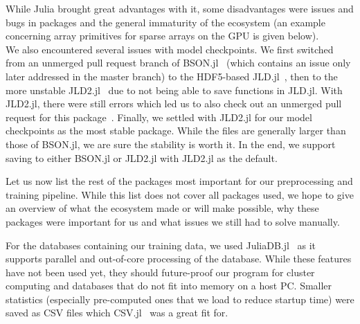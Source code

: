 While Julia brought great advantages with it, some disadvantages were
issues and bugs in packages and the general immaturity of the
ecosystem (an example concerning array primitives for sparse arrays on
the GPU is given below). \\
We also encountered several issues with model checkpoints. We first
switched from an unmerged pull request branch of
BSON.jl~\cite{JuliaIOBSONJl2019,SavingArrayLength} (which contains an
issue only later addressed in the master branch) to the HDF5-based
JLD.jl~\cite{JuliaIOJLDJl2019}, then to the more unstable
JLD2.jl~\cite{JuliaIOJLD2Jl2019} due to not being able to save
functions in JLD.jl. With JLD2.jl, there were still errors which led
us to also check out an unmerged pull request for this
package~\cite{MaybeFixTypename}. Finally, we settled with JLD2.jl for
our model checkpoints as the most stable package. While the files are
generally larger than those of BSON.jl, we are sure the stability is
worth it. In the end, we support saving to either BSON.jl or JLD2.jl
with JLD2.jl as the default.

Let us now list the rest of the packages most important for our
preprocessing and training pipeline. While this list does not cover
all packages used, we hope to give an overview of what the ecosystem
made or will make possible, why these packages were important for us
and what issues we still had to solve manually.

For the databases containing our training data, we used
JuliaDB.jl~\cite{JuliaComputingJuliaDBJl2019} as it supports parallel
and out-of-core processing of the database. While these features have
not been used yet, they should future-proof our program for cluster
computing and databases that do not fit into memory on a host PC.
Smaller statistics (especially pre-computed ones that we load to
reduce startup time) were saved as CSV files which
CSV.jl~\cite{JuliaDataCSVJl2019} was a great fit for.

